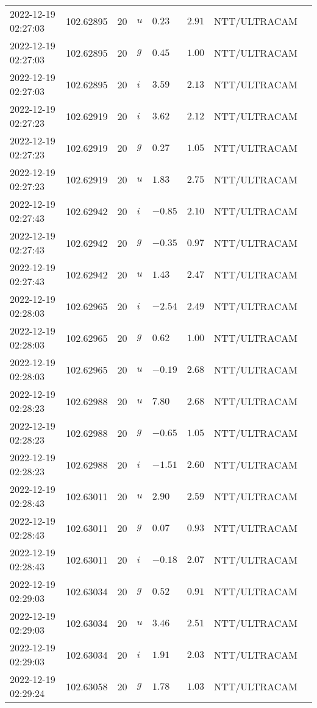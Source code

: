 \documentclass{nature_plusfigure}
\begin{document}
\begin{supplement}
\begin{center}
\begin{longtable}{llllllll}
2022-12-19 02:27:03 & 102.62895 & 20 & $u$ & $0.23$ & $2.91$ & NTT/ULTRACAM &  \\ 
2022-12-19 02:27:03 & 102.62895 & 20 & $g$ & $0.45$ & $1.00$ & NTT/ULTRACAM &  \\ 
2022-12-19 02:27:03 & 102.62895 & 20 & $i$ & $3.59$ & $2.13$ & NTT/ULTRACAM &  \\ 
2022-12-19 02:27:23 & 102.62919 & 20 & $i$ & $3.62$ & $2.12$ & NTT/ULTRACAM &  \\ 
2022-12-19 02:27:23 & 102.62919 & 20 & $g$ & $0.27$ & $1.05$ & NTT/ULTRACAM &  \\ 
2022-12-19 02:27:23 & 102.62919 & 20 & $u$ & $1.83$ & $2.75$ & NTT/ULTRACAM &  \\ 
2022-12-19 02:27:43 & 102.62942 & 20 & $i$ & $-0.85$ & $2.10$ & NTT/ULTRACAM &  \\ 
2022-12-19 02:27:43 & 102.62942 & 20 & $g$ & $-0.35$ & $0.97$ & NTT/ULTRACAM &  \\ 
2022-12-19 02:27:43 & 102.62942 & 20 & $u$ & $1.43$ & $2.47$ & NTT/ULTRACAM &  \\ 
2022-12-19 02:28:03 & 102.62965 & 20 & $i$ & $-2.54$ & $2.49$ & NTT/ULTRACAM &  \\ 
2022-12-19 02:28:03 & 102.62965 & 20 & $g$ & $0.62$ & $1.00$ & NTT/ULTRACAM &  \\ 
2022-12-19 02:28:03 & 102.62965 & 20 & $u$ & $-0.19$ & $2.68$ & NTT/ULTRACAM &  \\ 
2022-12-19 02:28:23 & 102.62988 & 20 & $u$ & $7.80$ & $2.68$ & NTT/ULTRACAM &  \\ 
2022-12-19 02:28:23 & 102.62988 & 20 & $g$ & $-0.65$ & $1.05$ & NTT/ULTRACAM &  \\ 
2022-12-19 02:28:23 & 102.62988 & 20 & $i$ & $-1.51$ & $2.60$ & NTT/ULTRACAM &  \\ 
2022-12-19 02:28:43 & 102.63011 & 20 & $u$ & $2.90$ & $2.59$ & NTT/ULTRACAM &  \\ 
2022-12-19 02:28:43 & 102.63011 & 20 & $g$ & $0.07$ & $0.93$ & NTT/ULTRACAM &  \\ 
2022-12-19 02:28:43 & 102.63011 & 20 & $i$ & $-0.18$ & $2.07$ & NTT/ULTRACAM &  \\ 
2022-12-19 02:29:03 & 102.63034 & 20 & $g$ & $0.52$ & $0.91$ & NTT/ULTRACAM &  \\ 
2022-12-19 02:29:03 & 102.63034 & 20 & $u$ & $3.46$ & $2.51$ & NTT/ULTRACAM &  \\ 
2022-12-19 02:29:03 & 102.63034 & 20 & $i$ & $1.91$ & $2.03$ & NTT/ULTRACAM &  \\ 
2022-12-19 02:29:24 & 102.63058 & 20 & $g$ & $1.78$ & $1.03$ & NTT/ULTRACAM &  \\ 

\end{longtable}
\end{center}
\end{supplement}
\end{document}
